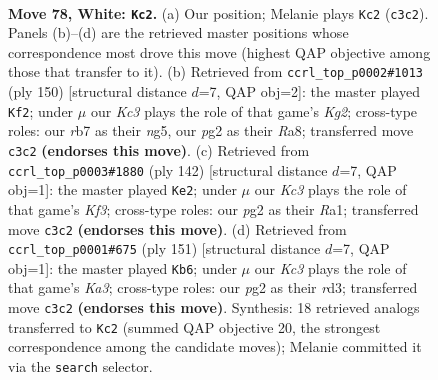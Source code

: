 \documentclass[11pt]{article}
\begin{document}
\clearpage

\begin{figure}[p]\centering
\begin{subfigure}{0.46\textwidth}\centering
\resizebox{\linewidth}{!}{%
\newchessgame
\chessboard[
  setfen={8/1r6/6k1/8/5p2/2K1p3/6p1/8 w - - 0 78},
  showmover=false,
  pgfstyle=straightmove, color=movearrow, markmove={c3-c2}
]}
\caption{}
\end{subfigure}\hfill
\begin{subfigure}{0.46\textwidth}\centering
\resizebox{\linewidth}{!}{%
\newchessgame
\chessboard[
  setfen={R7/4k3/6p1/5pn1/8/8/6K1/8 w - - 0 76},
  showmover=false,
  pgfstyle=straightmove, color=movearrow, markmove={g2-f2}
]}
\caption{}
\end{subfigure}
\\[4pt]
\begin{subfigure}{0.46\textwidth}\centering
\resizebox{\linewidth}{!}{%
\newchessgame
\chessboard[
  setfen={8/8/6p1/1k6/3p3r/5K2/8/R7 w - - 14 72},
  showmover=false,
  pgfstyle=straightmove, color=movearrow, markmove={f3-e2}
]}
\caption{}
\end{subfigure}\hfill
\begin{subfigure}{0.46\textwidth}\centering
\resizebox{\linewidth}{!}{%
\newchessgame
\chessboard[
  setfen={8/4K3/k7/8/1P6/P2R4/2r5/8 b - - 42 76},
  showmover=false,
  pgfstyle=straightmove, color=movearrow, markmove={a6-b6}
]}
\caption{}
\end{subfigure}
\caption{\textbf{Move 78, White: \texttt{Kc2}.} (a) Our position; Melanie plays \texttt{Kc2} (\texttt{c3c2}). Panels (b)--(d) are the retrieved master positions whose correspondence most drove this move (highest QAP objective among those that transfer to it). (b) Retrieved from \texttt{ccrl\_top\_p0002\#1013} (ply 150) [structural distance $d$=7, QAP obj=2]: the master played \texttt{Kf2}; under $\mu$ our \emph{Kc3} plays the role of that game's \emph{Kg2}; cross-type roles: our \emph{r}b7 as their \emph{n}g5, our \emph{p}g2 as their \emph{R}a8; transferred move \texttt{c3c2} \textbf{(endorses this move)}. (c) Retrieved from \texttt{ccrl\_top\_p0003\#1880} (ply 142) [structural distance $d$=7, QAP obj=1]: the master played \texttt{Ke2}; under $\mu$ our \emph{Kc3} plays the role of that game's \emph{Kf3}; cross-type roles: our \emph{p}g2 as their \emph{R}a1; transferred move \texttt{c3c2} \textbf{(endorses this move)}. (d) Retrieved from \texttt{ccrl\_top\_p0001\#675} (ply 151) [structural distance $d$=7, QAP obj=1]: the master played \texttt{Kb6}; under $\mu$ our \emph{Kc3} plays the role of that game's \emph{Ka3}; cross-type roles: our \emph{p}g2 as their \emph{r}d3; transferred move \texttt{c3c2} \textbf{(endorses this move)}. Synthesis: 18 retrieved analogs transferred to \texttt{Kc2} (summed QAP objective 20, the strongest correspondence among the candidate moves); Melanie committed it via the \texttt{search} selector.}
\label{fig:thought-m154}
\end{figure}
\end{document}
